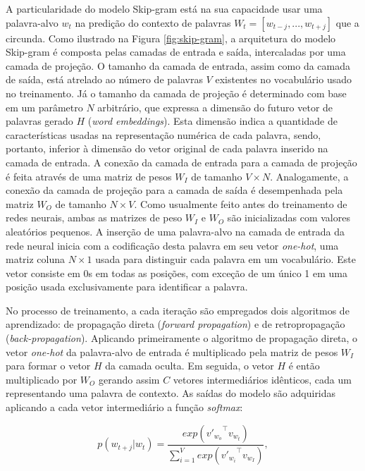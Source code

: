 \documentclass{SBCbookchapter}
\begin{document}
A particularidade do modelo Skip-gram está na sua capacidade usar uma palavra-alvo $w_{t}$ na predição do contexto de palavras $W_t=[w_{t-j},...,w_{t+j}]$ que a circunda. Como ilustrado na Figura \ref{fig:skip-gram}, a arquitetura do modelo Skip-gram é composta pelas camadas de entrada e saída, intercaladas por uma camada de projeção. O tamanho da camada de entrada, assim como da camada de saída, está atrelado ao número de palavras $V$ existentes no vocabulário usado no treinamento. Já o tamanho da camada de projeção é determinado com base em um parâmetro $N$ arbitrário, que expressa a dimensão do futuro vetor de palavras gerado $H$ (\textit{word embeddings}). Esta dimensão indica a quantidade de características usadas na representação numérica de cada palavra, sendo, portanto, inferior à dimensão do vetor original de cada palavra inserido na camada de entrada. A conexão da camada de entrada para a camada de projeção é feita através de uma matriz de pesos $W_{I}$ de tamanho $V\times N$. Analogamente, a conexão da camada de projeção para a camada de saída é desempenhada pela matriz $W_{O}$ de tamanho $N \times V$. Como usualmente feito antes do treinamento de redes neurais, ambas as matrizes de peso $W_{I}$ e $W_{O}$ são inicializadas com valores aleatórios pequenos. A inserção de uma palavra-alvo na camada de entrada da rede neural inicia com a codificação desta palavra em seu vetor \textit{one-hot}, uma matriz coluna $N \times 1$ usada para distinguir cada palavra em um vocabulário. Este vetor consiste em 0s em todas as posições, com exceção de um único 1 em uma posição usada exclusivamente para identificar a palavra. 

No processo de treinamento, a cada iteração são empregados dois algoritmos de aprendizado: de propagação direta (\textit{forward propagation}) e de retropropagação (\textit{back-propagation}). Aplicando primeiramente o algoritmo de propagação direta, o vetor \textit{one-hot} da palavra-alvo de entrada é  multiplicado pela matriz de pesos $W_{I}$ para formar o vetor $H$ da camada oculta. Em seguida, o vetor $H$ é então multiplicado por $W_{O}$ gerando assim $C$ vetores intermediários idênticos, cada um representando uma palavra de contexto. As saídas do modelo são adquiridas aplicando a cada vetor intermediário a função \textit{softmax}:

\begin{equation}
    p(w_{t+j}|w_t)=\frac{exp({{v'}_{w_o}}^{\top} v_{w_t})}{\sum_{i=1}^{V}exp({{v'}_{w_i}}^{\top} v_{w_I})},
\end{equation}
\end{document}
